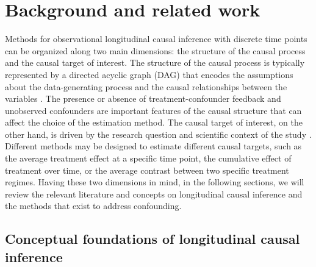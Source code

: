 \chapter{Background and related work}
\label{chap:literature_review}

Methods for observational longitudinal causal inference with discrete time points can be organized along two main dimensions: 
the structure of the causal process and the causal target of interest. 
The structure of the causal process is typically represented by a directed acyclic graph (DAG) 
that encodes the assumptions about the data-generating process and the causal relationships 
between the variables \cite{pearlCausalityModelsReasoning2009}. The presence or absence of 
treatment-confounder feedback 
and unobserved confounders are important features of the causal structure that can affect the 
choice of the estimation method. The causal target of interest, on the other hand, is driven by the 
research question and scientific context of the study \cite{lundbergWhatYourEstimand2021}. Different methods may be designed to estimate 
different causal targets, such as the average treatment effect at a specific time point, the cumulative 
effect of treatment over time, or the average contrast between two specific treatment regimes. Having these 
two dimensions in mind, in the 
following sections, we will review the relevant literature and concepts on longitudinal causal inference 
and the methods that exist to address confounding.

\section{Conceptual foundations of longitudinal causal inference}
